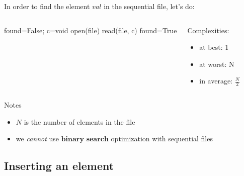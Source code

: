 \documentclass{beamer}[10pt, usepdftitle=false, handout]
\begin{document}
	\begin{frame}
	
	In order to find the element $val$ in the sequential file, let's do:
	
	\begin{columns}[c]
	\begin{center}    
    \scalebox{0.75} {
    \begin{algorithm}[H] 
	found=False; c=void\; 
	open(file)\;
     {
		read(file, c)\;
	}
	 {
		found=True\;
	}    
	\end{algorithm}	
	}
	\end{center}	 	
	\begin{center}
		Complexities:
		\begin{itemize}
			\item {at best: 1}
			\item {at worst: N}
			\item {in average: $\frac{N}{2}$}		
		\end{itemize}			
	\end{center}
	\end{columns}		
	
	\pause
	
	\begin{block}{Notes}
		\begin{itemize}
			\item {$N$ is the number of elements in the file}
			\item {we \textit{cannot} use $\textbf{binary search}$ optimization with sequential files}
		\end{itemize}			
	\end{block}	
	
	\end{frame}
	
	\subsection{Inserting an element}	
			
\end{document}
